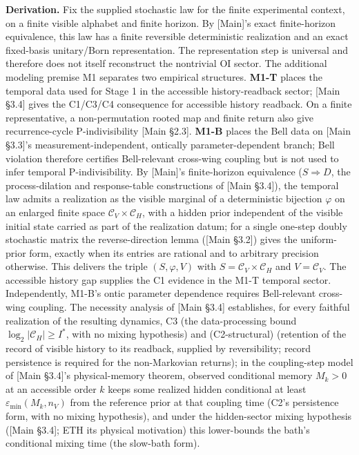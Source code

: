 \documentclass[
]{article}
\begin{document}
\textbf{Derivation.} Fix the supplied stochastic law for the finite
experimental context, on a finite visible alphabet and finite horizon.
By {[}Main{]}'s exact finite-horizon equivalence, this law has a finite
reversible deterministic realization and an exact fixed-basis
unitary/Born representation. The representation step is universal and
therefore does not itself reconstruct the nontrivial OI sector. The
additional modeling premise M1 separates two empirical structures.
\textbf{M1-T} places the temporal data used for Stage 1 in the
accessible history-readback sector; {[}Main §3.4{]} gives the C1/C3/C4
consequence for accessible history readback. On a finite representative,
a non-permutation rooted map and finite return also give
recurrence-cycle P-indivisibility {[}Main §2.3{]}. \textbf{M1-B} places
the Bell data on {[}Main §3.3{]}'s measurement-independent, ontically
parameter-dependent branch; Bell violation therefore certifies
Bell-relevant cross-wing coupling but is not used to infer temporal
P-indivisibility. By {[}Main{]}'s finite-horizon equivalence
(\(S \Rightarrow D\), the process-dilation and response-table
constructions of {[}Main §3.4{]}), the temporal law admits a realization
as the visible marginal of a deterministic bijection \(\varphi\) on an
enlarged finite space \(\mathcal{C}_V \times \mathcal{C}_H\), with a
hidden prior independent of the visible initial state carried as part of
the realization datum; for a single one-step doubly stochastic matrix
the reverse-direction lemma ({[}Main §3.2{]}) gives the uniform-prior
form, exactly when its entries are rational and to arbitrary precision
otherwise. This delivers the triple \((S, \varphi, V)\) with
\(S = \mathcal{C}_V \times \mathcal{C}_H\) and \(V = \mathcal{C}_V\).
The accessible history gap supplies the C1 evidence in the M1-T temporal
sector. Independently, M1-B's ontic parameter dependence requires
Bell-relevant cross-wing coupling. The necessity analysis of {[}Main
§3.4{]} establishes, for every faithful realization of the resulting
dynamics, C3 (the data-processing bound
\(\log_2|\mathcal{C}_H| \geq I^*\), with no mixing hypothesis) and
(C2-structural) (retention of the record of visible history to its
readback, supplied by reversibility; record persistence is required for
the non-Markovian returns); in the coupling-step model of {[}Main
§3.4{]}'s physical-memory theorem, observed conditional memory
\(M_k > 0\) at an accessible order \(k\) keeps some realized hidden
conditional at least \(\varepsilon_{\min}(M_k, n_V)\) from the reference
prior at that coupling time (C2's persistence form, with no mixing
hypothesis), and under the hidden-sector mixing hypothesis ({[}Main
§3.4{]}; ETH its physical motivation) this lower-bounds the bath's
conditional mixing time (the slow-bath form).
\end{document}
